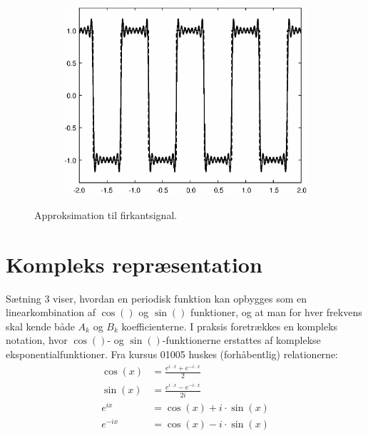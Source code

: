 \documentclass[11pt,a4paper]{article}
\begin{document}
\begin{figure}[htbp]
\begin{subfigure}{0.48\textwidth}
\end{subfigure}
\begin{subfigure}{0.48\textwidth}
\includegraphics[scale=0.5]{approx2_015}
\end{subfigure}
\caption{\label{fig:figapprox2}Approksimation til firkantsignal.}
\end{figure}

\section{Kompleks repræsentation}
Sætning 3 viser, hvordan en periodisk funktion kan opbygges som en linearkombination af $\cos()$ og $\sin()$ funktioner, og at man for hver frekvens skal kende både $A_k$ og $B_k$ koefficienterne. I praksis foretrækkes en kompleks notation, hvor $\cos()$- og $\sin()$-funktionerne erstattes af komplekse eksponentialfunktioner. Fra kursus 01005 huskes (forhåbentlig) relationerne:
\begin{align}
\cos(x) &= \frac{e^{i\cdot{}x}+e^{-i\cdot{}x}}{2}\\
\sin(x) &= \frac{e^{i\cdot{}x}-e^{-i\cdot{}x}}{2i}\\
e^{ix}  &= \cos(x) + i\cdot\sin(x)\\
e^{-ix} &= \cos(x) - i\cdot\sin(x)
\end{align}
\end{document}
